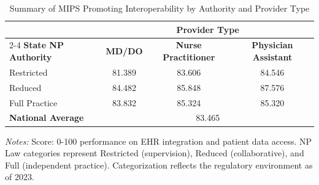 \begin{table}[htbp]
    \centering
    \caption{Summary of MIPS Promoting Interoperability by Authority and Provider Type}
    \label{tab:mips_pi_score_provtype}
    \vspace{0.2cm}
    \begin{tabular}{lccc}
        \toprule
        & \multicolumn{3}{c}{\textbf{Provider Type}} \\
        \cmidrule(lr){2-4}
        \textbf{State NP Authority} & \textbf{MD/DO} & \textbf{Nurse Practitioner} & \textbf{Physician Assistant} \\
        \midrule
        Restricted & 81.389 & 83.606 & 84.546 \\
        Reduced & 84.482 & 85.848 & 87.576 \\
        Full Practice & 83.832 & 85.324 & 85.320 \\
        \midrule
        \textbf{National Average} & \multicolumn{3}{c}{83.465} \\
        \bottomrule
    \end{tabular}
    \vspace{0.1cm}
    \begin{minipage}{0.85\textwidth}
        \footnotesize \textit{Notes:} Score: 0-100 performance on EHR integration and patient data access. NP Law categories represent Restricted (supervision), Reduced (collaborative), and Full (independent practice). Categorization reflects the regulatory environment as of 2023.
    \end{minipage}
\end{table}